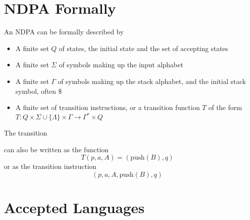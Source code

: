 \section*{NDPA Formally}

\begin{definition*}{}{}
  An NDPA can be formally described by
  \begin{itemize}
    \item A finite set $Q$ of states, the initial state and the set of accepting states
    \item A finite set $\Sigma$ of symbols making up the input alphabet
    \item A finite set $\Gamma$ of symbols making up the stack alphabet, and the initial stack symbol, often $\$$
    \item A finite set of transition instructions, or a transition function $T$ of the form 
     $T : Q \times \Sigma \cup \{\Lambda\} \times \Gamma \rightarrow \Gamma^* \times Q$
  \end{itemize}
\end{definition*}

\begin{example*}{}{}
  The transition
  \begin{center}
  \end{center}
  can also be written as the function
  \begin{equation*}
    T(p, a, A) = (\mathrm{push}(B), q)
  \end{equation*}
  or as the transition instruction
  \begin{equation*}
    (p, a, A, \mathrm{push}(B), q)
  \end{equation*}
\end{example*}

\section*{Accepted Languages}

